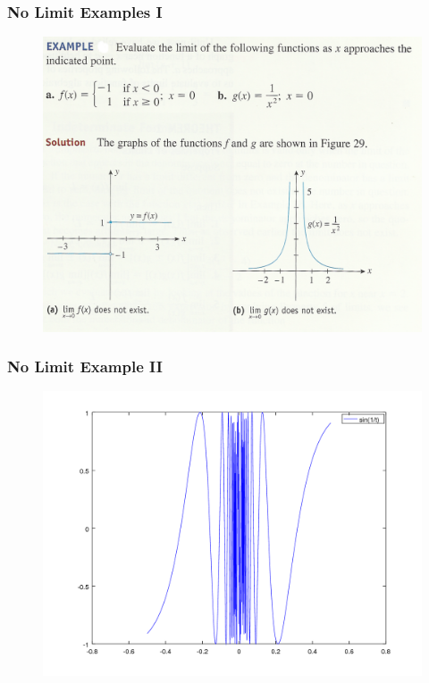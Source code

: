 \documentclass[xcolor=dvipsnames]{beamer}
\begin{document}
\begin{frame}
  \frametitle{No Limit Examples I}
  \begin{figure}[h]
    \includegraphics[scale=.9]{./diagrams/limita.png}
  \end{figure}
\end{frame}

\begin{frame}
  \frametitle{No Limit Example II}
  \begin{figure}[h]
    \includegraphics[scale=.5]{./diagrams/sineoneoverx.png}
  \end{figure}
\end{frame}
\end{document}

